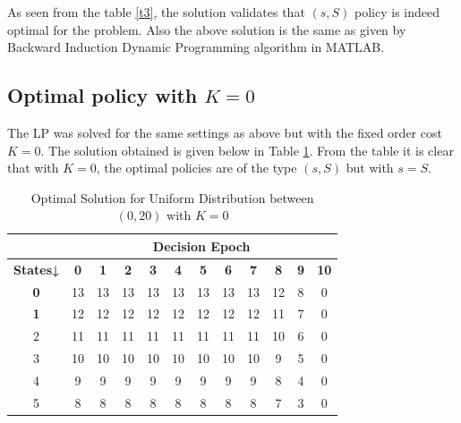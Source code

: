 \documentclass[11pt,a4paper,oneside]{report}
\begin{document}
As seen from the table \ref{t3}, the solution validates that $(s,S)$ policy is indeed optimal for the problem. Also the above solution is the same as given by Backward Induction Dynamic Programming algorithm in MATLAB. 
\subsection{Optimal policy with $K = 0$} 
The LP was solved for the same settings as above but with the fixed order cost $K = 0.$ The solution obtained is given below in Table \ref{t4}. From the table it is clear that with $K = 0$, the optimal policies are of the type $(s, S)$ but with $s = S$.
\begin{table}[H]
\centering
\caption{Optimal Solution for Uniform Distribution between $(0,20)$ with $K = 0$}
\label{t4}
\begin{tabular}{|c|c|c|c|c|c|c|c|c|c|c|c|}
\hline
                 & \multicolumn{11}{c|}{\textbf{Decision Epoch}}                                                                                                 \\ \hline
\textbf{States↓} & \textbf{0} & \textbf{1} & \textbf{2} & \textbf{3} & \textbf{4} & \textbf{5} & \textbf{6} & \textbf{7} & \textbf{8} & \textbf{9} & \textbf{10} \\ \hline
\textbf{0}       & 13         & 13         & 13         & 13         & 13         & 13         & 13         & 13         & 12         & 8          & 0           \\ \hline
\textbf{1}       & 12         & 12         & 12         & 12         & 12         & 12         & 12         & 12         & 11         & 7          & 0           \\ \hline
2                & 11         & 11         & 11         & 11         & 11         & 11         & 11         & 11         & 10         & 6          & 0           \\ \hline
3                & 10         & 10         & 10         & 10         & 10         & 10         & 10         & 10         & 9          & 5          & 0           \\ \hline
4                & 9          & 9          & 9          & 9          & 9          & 9          & 9          & 9          & 8          & 4          & 0           \\ \hline
5                & 8          & 8          & 8          & 8          & 8          & 8          & 8          & 8          & 7          & 3          & 0           \\ \hline

\end{tabular}
\end{table}
\end{document}
